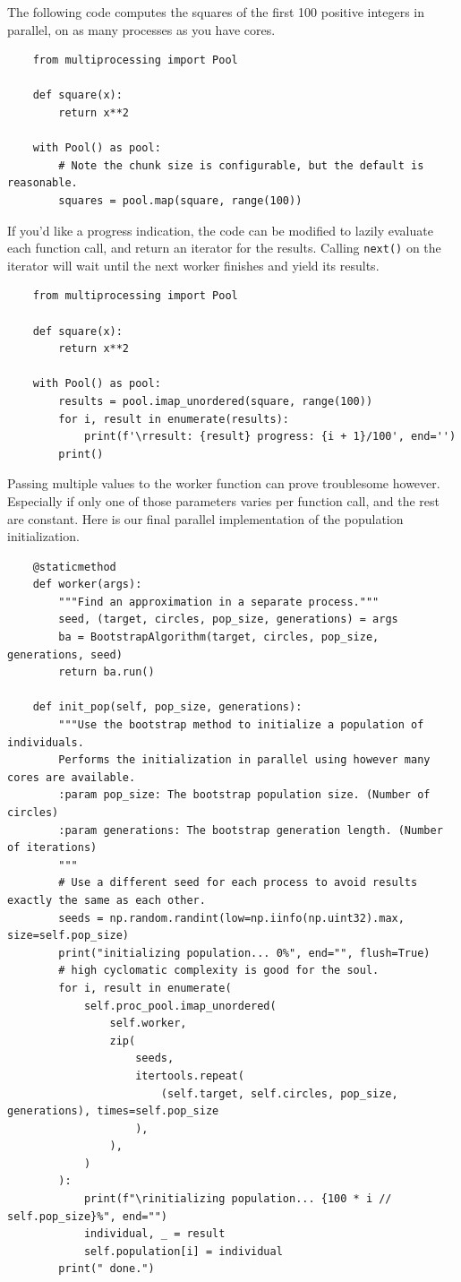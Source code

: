 \documentclass{article}
\begin{document}
The following code computes the squares of the first 100 positive integers in parallel, on as many processes as you have cores.
\begin{verbatim}
    from multiprocessing import Pool

    def square(x):
        return x**2

    with Pool() as pool:
        # Note the chunk size is configurable, but the default is reasonable.
        squares = pool.map(square, range(100))
\end{verbatim}
If you'd like a progress indication, the code can be modified to lazily evaluate each function call, and return an iterator for the results. Calling \texttt{next()} on the iterator will wait until the next worker finishes and yield its results.
\begin{verbatim}
    from multiprocessing import Pool
    
    def square(x):
        return x**2
    
    with Pool() as pool:
        results = pool.imap_unordered(square, range(100))
        for i, result in enumerate(results):
            print(f'\rresult: {result} progress: {i + 1}/100', end='')
        print()
\end{verbatim}

Passing multiple values to the worker function can prove troublesome however. Especially if only one of those parameters varies per function call, and the rest are constant. Here is our final parallel implementation of the population initialization.

\begin{verbatim}
    @staticmethod
    def worker(args):
        """Find an approximation in a separate process."""
        seed, (target, circles, pop_size, generations) = args
        ba = BootstrapAlgorithm(target, circles, pop_size, generations, seed)
        return ba.run()
    
    def init_pop(self, pop_size, generations):
        """Use the bootstrap method to initialize a population of individuals.
        Performs the initialization in parallel using however many cores are available.
        :param pop_size: The bootstrap population size. (Number of circles)
        :param generations: The bootstrap generation length. (Number of iterations)
        """
        # Use a different seed for each process to avoid results exactly the same as each other.
        seeds = np.random.randint(low=np.iinfo(np.uint32).max, size=self.pop_size)
        print("initializing population... 0%", end="", flush=True)
        # high cyclomatic complexity is good for the soul.
        for i, result in enumerate(
            self.proc_pool.imap_unordered(
                self.worker,
                zip(
                    seeds,
                    itertools.repeat(
                        (self.target, self.circles, pop_size, generations), times=self.pop_size
                    ),
                ),
            )
        ):
            print(f"\rinitializing population... {100 * i // self.pop_size}%", end="")
            individual, _ = result
            self.population[i] = individual
        print(" done.")
\end{verbatim}
\end{document}
